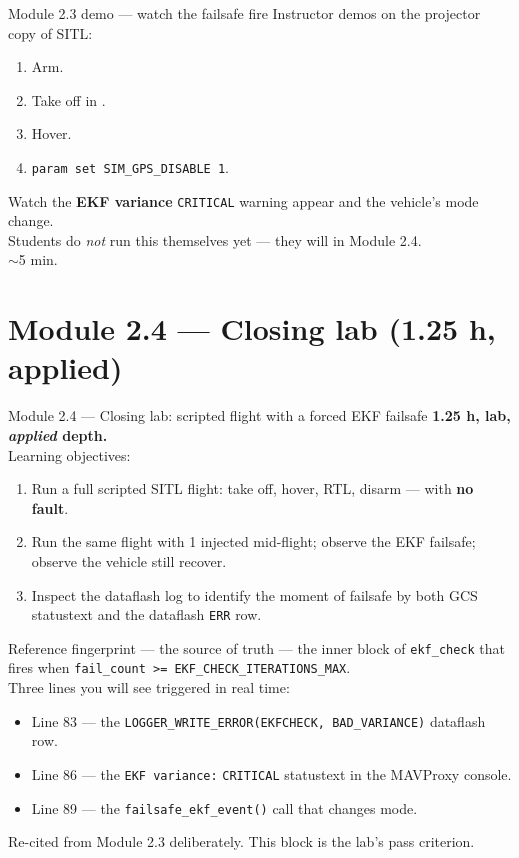 \documentclass[aspectratio=169,11pt]{beamer}
\begin{document}
\begin{frame}{Module 2.3 demo --- watch the failsafe fire}
  Instructor demos on the projector copy of SITL:
  \begin{enumerate}
    \item Arm.
    \item Take off in .
    \item Hover.
    \item \texttt{param set SIM\_GPS\_DISABLE 1}.
  \end{enumerate}
  Watch the \textbf{EKF variance} \texttt{CRITICAL} warning appear and the vehicle's mode change.\\[1ex]
  Students do \emph{not} run this themselves yet --- they will in Module 2.4.\\[1ex]
  $\sim$5 min.
\end{frame}

\section{Module 2.4 --- Closing lab (1.25 h, applied)}

\begin{frame}{Module 2.4 --- Closing lab: scripted flight with a forced EKF failsafe}
  \textbf{1.25 h, lab, \emph{applied} depth.}\\[1ex]
  Learning objectives:
  \begin{enumerate}
    \item Run a full scripted SITL flight: take off, hover, RTL, disarm --- with \textbf{no fault}.
    \item Run the same flight with  1 injected mid-flight; observe the EKF failsafe; observe the vehicle still recover.
    \item Inspect the dataflash log to identify the moment of failsafe by both GCS statustext and the dataflash \texttt{ERR} row.
  \end{enumerate}
\end{frame}

\begin{frame}{Reference fingerprint --- the source of truth}
   --- the inner block of \texttt{ekf\_check} that fires when \texttt{fail\_count >= EKF\_CHECK\_ITERATIONS\_MAX}.\\[1ex]
  Three lines you will see triggered in real time:
  \begin{itemize}
    \item Line 83 --- the \texttt{LOGGER\_WRITE\_ERROR(EKFCHECK, BAD\_VARIANCE)} dataflash row.
    \item Line 86 --- the \texttt{EKF variance:} \texttt{CRITICAL} statustext in the MAVProxy console.
    \item Line 89 --- the \texttt{failsafe\_ekf\_event()} call that changes mode.
  \end{itemize}
  Re-cited from Module 2.3 deliberately. This block is the lab's pass criterion.
\end{frame}
\end{document}
